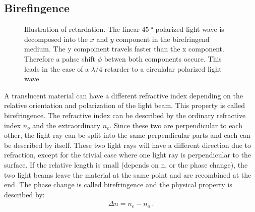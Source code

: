 \subsection{Birefingence}
%
\begin{figure}[!t]
\centering
\setlength{\tikzwidth}{\textwidth}
\caption{Illustration of retardation. The linear $\SI{45}{\degree}$ polarized light wave is decomposed into the $x$ and $y$ component in the birefringend medium. The y compoinent travels faster than the x component. Therefore a pahse shift $\phi$ betwen both components occure. This leads in the case of a $\lambda/4$ retarder to a circulalar polarized light wave. }
\label{fig:optic_retardation}
\end{figure}
%
A translucent material can have a different refractive index depending on the relative orientation and polarization of the light beam.
This property is called birefringence.
The refractive index can be described by the ordinary refractive index $n_o$ and the extraordinary $n_e$.
Since these two are perpendicular to each other, the light ray can be split into the same perpendicular parts and each can be described by itself.
These two light rays will have a different direction due to refraction, except for the trivial case where one light ray is perpendicular to the surface.
If the relative length is small (depends on n, or the phase change), the two light beams leave the material at the same point and are recombined at the end.
The phase change is called birefringence and the physical property is described by:
%
\begin{align}
    \Delta n = n_e - n_o \> .
\end{align}
%
%
%
